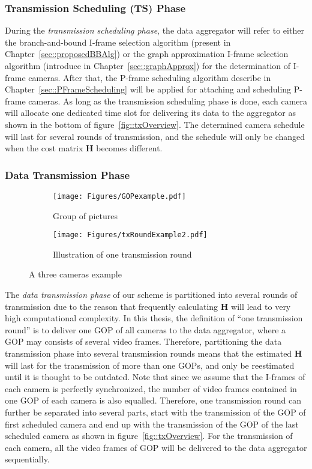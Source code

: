 {\subsubsection{Transmission Scheduling (TS) Phase}
During the \emph{transmission scheduling phase}, the data aggregator will refer to either the branch-and-bound I-frame selection algorithm (present in Chapter~\ref{sec::proposedBBAlg}) or the graph approximation I-frame selection algorithm (introduce in Chapter~\ref{sec::graphApprox}) for the determination of I-frame cameras.
After that, the P-frame scheduling algorithm describe in Chapter~\ref{sec::PFrameScheduling} will be applied for attaching and scheduling P-frame cameras.
As long as the transmission scheduling phase is done, each camera will allocate one dedicated time slot for delivering its data to the aggregator as shown in the bottom of figure~\ref{fig::txOverview}.
The determined camera schedule will last for several rounds of transmission, and the schedule will only be changed when the cost matrix $\mathbf{H}$ becomes different.
%
\subsubsection{Data Transmission Phase}
\label{sec::dataTransmissionPhase}
\begin{figure}
\begin{center}
\begin{subfigure}[b]{0.65\columnwidth}
\texttt{[image: Figures/GOPexample.pdf]}
\caption{\label{fig::txRoundExampleGOP}Group of pictures}
\end{subfigure}
\begin{subfigure}[b]{0.95\columnwidth}
\texttt{[image: Figures/txRoundExample2.pdf]}
\caption{\label{fig::txRoundExampleTx}Illustration of one transmission round}
\end{subfigure}
\caption{\label{fig::txRoundExample}A three cameras example}
\end{center}
\end{figure}
The \emph{data transmission phase} of our scheme is partitioned into several rounds of transmission due to the reason that frequently calculating $\mathbf{H}$ will lead to very high computational complexity.
In this thesis, the definition of ``one transmission round'' is to deliver one GOP of all cameras to the data aggregator, where a GOP may consists of several video frames.
Therefore, partitioning the data transmission phase into several transmission rounds means that the estimated $\mathbf{H}$ will last for the transmission of more than one GOPs, and only be reestimated until it is thought to be outdated.
Note that since we assume that the I-frames of each camera is perfectly synchronized, the number of video frames contained in one GOP of each camera is also equalled.
Therefore, one transmission round can further be separated into several parts, start with the transmission of the GOP of first scheduled camera and end up with the transmission of the GOP of the last scheduled camera as shown in figure~\ref{fig::txOverview}.
For the transmission of each camera, all the video frames of GOP will be delivered to the data aggregator sequentially.

}

